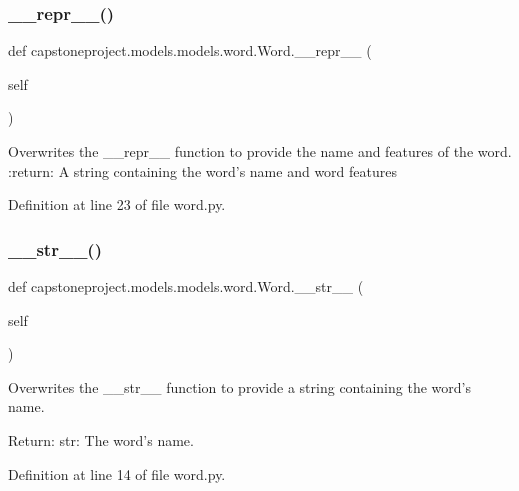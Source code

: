 \subsubsection{\texorpdfstring{\+\_\+\+\_\+repr\+\_\+\+\_\+()}{\_\_repr\_\_()}}
{\footnotesize\ttfamily def capstoneproject.\+models.\+models.\+word.\+Word.\+\_\+\+\_\+repr\+\_\+\+\_\+ (\begin{DoxyParamCaption}\item[{}]{self }\end{DoxyParamCaption})}

\begin{DoxyVerb}Overwrites the __repr__ function to provide the name and features of
the word.
:return: A string containing the word's name and word features
\end{DoxyVerb}
 

Definition at line 23 of file word.\+py.

\mbox{\label{classcapstoneproject_1_1models_1_1models_1_1word_1_1_word_af88bfd4c2f40177ad2dcca0df1f105b5}} 
\subsubsection{\texorpdfstring{\+\_\+\+\_\+str\+\_\+\+\_\+()}{\_\_str\_\_()}}
{\footnotesize\ttfamily def capstoneproject.\+models.\+models.\+word.\+Word.\+\_\+\+\_\+str\+\_\+\+\_\+ (\begin{DoxyParamCaption}\item[{}]{self }\end{DoxyParamCaption})}

\begin{DoxyVerb}Overwrites the __str__ function to provide a string containing the
word's name.

Return:
    str: The word's name.
\end{DoxyVerb}
 

Definition at line 14 of file word.\+py.

\mbox{\label{classcapstoneproject_1_1models_1_1models_1_1word_1_1_word_a650416daf4d5819e51ade1c960193174}} 
